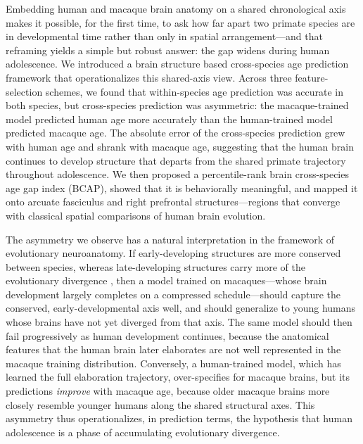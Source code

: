 \documentclass[11pt]{article}
\begin{document}
Embedding human and macaque brain anatomy on a shared chronological axis makes it possible, for the first time, to ask how far apart two primate species are in developmental time rather than only in spatial arrangement---and that reframing yields a simple but robust answer: the gap widens during human adolescence. We introduced a brain structure based cross-species age prediction framework that operationalizes this shared-axis view. Across three feature-selection schemes, we found that within-species age prediction was accurate in both species, but cross-species prediction was asymmetric: the macaque-trained model predicted human age more accurately than the human-trained model predicted macaque age. The absolute error of the cross-species prediction grew with human age and shrank with macaque age, suggesting that the human brain continues to develop structure that departs from the shared primate trajectory throughout adolescence. We then proposed a percentile-rank brain cross-species age gap index (BCAP), showed that it is behaviorally meaningful, and mapped it onto arcuate fasciculus and right prefrontal structures---regions that converge with classical spatial comparisons of human brain evolution.

The asymmetry we observe has a natural interpretation in the framework of evolutionary neuroanatomy. If early-developing structures are more conserved between species, whereas late-developing structures carry more of the evolutionary divergence \citep{miller2012prolonged, rilling2014comparative}, then a model trained on macaques---whose brain development largely completes on a compressed schedule---should capture the conserved, early-developmental axis well, and should generalize to young humans whose brains have not yet diverged from that axis. The same model should then fail progressively as human development continues, because the anatomical features that the human brain later elaborates are not well represented in the macaque training distribution. Conversely, a human-trained model, which has learned the full elaboration trajectory, over-specifies for macaque brains, but its predictions \textit{improve} with macaque age, because older macaque brains more closely resemble younger humans along the shared structural axes. This asymmetry thus operationalizes, in prediction terms, the hypothesis that human adolescence is a phase of accumulating evolutionary divergence.
\end{document}
